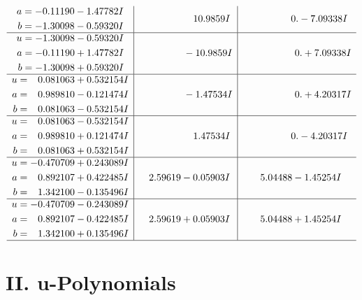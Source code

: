 \documentclass[1p]{elsarticle_modified}
\theoremstyle{definition}
\begin{document}
$$\begin{array}{c|c|c}
\begin{aligned}
a &= -0.11190 - 1.47782 I \\
b &= -1.30098 - 0.59320 I\end{aligned}
 & \phantom{-0.000000 -}10.9859 I & \phantom{-0.000000 } 0. - 7.09338 I \\ \hline\begin{aligned}
u &= -1.30098 - 0.59320 I \\
a &= -0.11190 + 1.47782 I \\
b &= -1.30098 + 0.59320 I\end{aligned}
 & \phantom{-0.000000 } -10.9859 I & \phantom{-0.000000 -}0. + 7.09338 I \\ \hline\begin{aligned}
u &= \phantom{-}0.081063 + 0.532154 I \\
a &= \phantom{-}0.989810 - 0.121474 I \\
b &= \phantom{-}0.081063 - 0.532154 I\end{aligned}
 & \phantom{-0.000000 } -1.47534 I & \phantom{-0.000000 -}0. + 4.20317 I \\ \hline\begin{aligned}
u &= \phantom{-}0.081063 - 0.532154 I \\
a &= \phantom{-}0.989810 + 0.121474 I \\
b &= \phantom{-}0.081063 + 0.532154 I\end{aligned}
 & \phantom{-0.000000 -}1.47534 I & \phantom{-0.000000 } 0. - 4.20317 I \\ \hline\begin{aligned}
u &= -0.470709 + 0.243089 I \\
a &= \phantom{-}0.892107 + 0.422485 I \\
b &= \phantom{-}1.342100 - 0.135496 I\end{aligned}
 & \phantom{-}2.59619 - 0.05903 I & \phantom{-}5.04488 - 1.45254 I \\ \hline\begin{aligned}
u &= -0.470709 - 0.243089 I \\
a &= \phantom{-}0.892107 - 0.422485 I \\
b &= \phantom{-}1.342100 + 0.135496 I\end{aligned}
 & \phantom{-}2.59619 + 0.05903 I & \phantom{-}5.04488 + 1.45254 I\\
 \hline 
 \end{array}$$\newpage
\newpage\renewcommand{\arraystretch}{1}
\centering \section*{ II. u-Polynomials}
\end{document}
